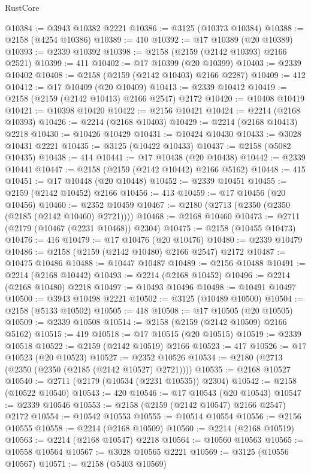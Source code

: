 \begin{lexlean}{RustCore}
\begin{coremodule}
@10384 := @3943 @10382 @2221
@10386 := @3125 (@10373 @10384)
@10388 := @2158 (@4254 @10386)
@10389 := 410
@10392 := @17 @10389 (@20 @10389)
@10393 := @2339 @10392
@10398 := @2158 (@2159 (@2142 @10393) @2166 @2521)
@10399 := 411
@10402 := @17 @10399 (@20 @10399)
@10403 := @2339 @10402
@10408 := @2158 (@2159 (@2142 @10403) @2166 @2287)
@10409 := 412
@10412 := @17 @10409 (@20 @10409)
@10413 := @2339 @10412
@10419 := @2158 (@2159 (@2142 @10413) @2166 @2547) @2172
@10420 := @10408 @10419
@10421 := @10398 @10420
@10422 := @2156 @10421
@10424 := @2214 (@2168 @10393)
@10426 := @2214 (@2168 @10403)
@10429 := @2214 (@2168 @10413) @2218
@10430 := @10426 @10429
@10431 := @10424 @10430
@10433 := @3028 @10431 @2221
@10435 := @3125 (@10422 @10433)
@10437 := @2158 (@5082 @10435)
@10438 := 414
@10441 := @17 @10438 (@20 @10438)
@10442 := @2339 @10441
@10447 := @2158 (@2159 (@2142 @10442) @2166 @5162)
@10448 := 415
@10451 := @17 @10448 (@20 @10448)
@10452 := @2339 @10451
@10455 := @2159 (@2142 @10452) @2166
@10456 := 413
@10459 := @17 @10456 (@20 @10456)
@10460 := @2352 @10459
@10467 := @2180 (@2713 (@2350 (@2350 (@2185 (@2142 @10460) @2721))))
@10468 := @2168 @10460
@10473 := @2711 (@2179 (@10467 (@2231 @10468)) @2304)
@10475 := @2158 (@10455 @10473)
@10476 := 416
@10479 := @17 @10476 (@20 @10476)
@10480 := @2339 @10479
@10486 := @2158 (@2159 (@2142 @10480) @2166 @2547) @2172
@10487 := @10475 @10486
@10488 := @10447 @10487
@10489 := @2156 @10488
@10491 := @2214 (@2168 @10442)
@10493 := @2214 (@2168 @10452)
@10496 := @2214 (@2168 @10480) @2218
@10497 := @10493 @10496
@10498 := @10491 @10497
@10500 := @3943 @10498 @2221
@10502 := @3125 (@10489 @10500)
@10504 := @2158 (@5133 @10502)
@10505 := 418
@10508 := @17 @10505 (@20 @10505)
@10509 := @2339 @10508
@10514 := @2158 (@2159 (@2142 @10509) @2166 @5162)
@10515 := 419
@10518 := @17 @10515 (@20 @10515)
@10519 := @2339 @10518
@10522 := @2159 (@2142 @10519) @2166
@10523 := 417
@10526 := @17 @10523 (@20 @10523)
@10527 := @2352 @10526
@10534 := @2180 (@2713 (@2350 (@2350 (@2185 (@2142 @10527) @2721))))
@10535 := @2168 @10527
@10540 := @2711 (@2179 (@10534 (@2231 @10535)) @2304)
@10542 := @2158 (@10522 @10540)
@10543 := 420
@10546 := @17 @10543 (@20 @10543)
@10547 := @2339 @10546
@10553 := @2158 (@2159 (@2142 @10547) @2166 @2547) @2172
@10554 := @10542 @10553
@10555 := @10514 @10554
@10556 := @2156 @10555
@10558 := @2214 (@2168 @10509)
@10560 := @2214 (@2168 @10519)
@10563 := @2214 (@2168 @10547) @2218
@10564 := @10560 @10563
@10565 := @10558 @10564
@10567 := @3028 @10565 @2221
@10569 := @3125 (@10556 @10567)
@10571 := @2158 (@5403 @10569)

\end{coremodule}
\end{lexlean}
